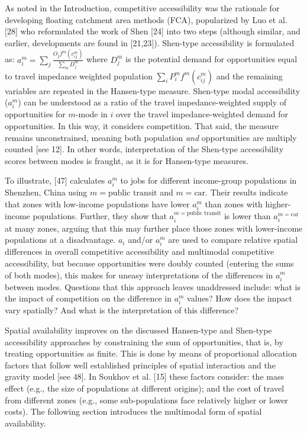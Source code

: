 \documentclass[10pt,letterpaper]{article}
\begin{document}
As noted in the Introduction, competitive accessibility was the
rationale for developing floating catchment area methods (FCA),
popularized by Luo et al. {[}28{]} who reformulated the work of Shen
{[}24{]} into two steps (although similar, and earlier, developments are
found in {[}21,23{]}). Shen-type accessibility is formulated as:
\(a_i^m = \sum_j \frac{O_jf^m(c_{ij}^m)}{\sum_m D_j^m}\) where \(D_j^m\)
is the potential demand for opportunities equal to travel impedance
weighted population \(\sum_i P_i^m f^m(c_{ij}^m)\) and the remaining
variables are repeated in the Hansen-type measure. Shen-type modal
accessibility (\(a_i^m\)) can be understood as a ratio of the travel
impedance-weighted supply of opportunities for \(m\)-mode in \(i\) over
the travel impedance-weighted demand for opportunities. In this way, it
considers competition. That said, the measure remains unconstrained,
meaning both population \emph{and} opportunities are multiply counted
{[}see 12{]}. In other words, interpretation of the Shen-type
accessibility scores between modes is fraught, as it is for Hansen-type
measures.

To illustrate, {[}47{]} calculates \(a_i^m\) to jobs for different
income-group populations in Shenzhen, China using
\(m = \text{public transit}\) and \(m=\text{car}\). Their results
indicate that zones with low-income populations have lower \(a_i^m\)
than zones with higher-income populations. Further, they show that
\(a_i^{m=\text{public transit}}\) is lower than \(a_i^{m=\text{car}}\)
at many zones, arguing that this may further place those zones with
lower-income populations at a disadvantage. \(a_i\) and/or \(a_i^m\) are
used to compare relative spatial differences in overall competitive
accessibility and multimodal competitive accessibility, but because
opportunities were doubly counted (entering the sums of both modes),
this makes for uneasy interpretations of the differences in \(a_i^{m}\)
between modes. Questions that this approach leaves unaddressed include:
what is the impact of competition on the difference in \(a_i^m\) values?
How does the impact vary spatially? And what is the interpretation of
this difference?

Spatial availability improves on the discussed Hansen-type and Shen-type
accessibility approaches by constraining the sum of opportunities, that
is, by treating opportunities as finite. This is done by means of
proportional allocation factors that follow well established principles
of spatial interaction and the gravity model {[}see 48{]}. In Soukhov et
al. {[}15{]} these factors consider: the mass effect (e.g., the size of
populations at different origins); and the cost of travel from different
zones (e.g., some sub-populations face relatively higher or lower
costs). The following section introduces the multimodal form of spatial
availability.
\end{document}
